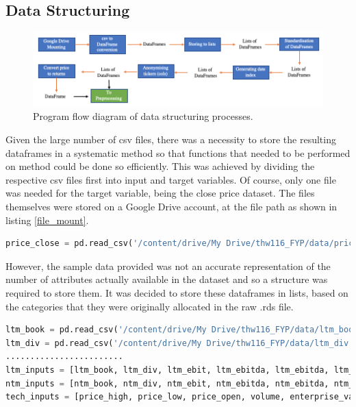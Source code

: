 \documentclass[10pt,onecolumn,letterpaper]{article}
\begin{document}
\fi

\subsection{Data Structuring}
 
\begin{figure}[!hbt!]
\centering
\includegraphics[width=\columnwidth]{data_structuring.png}
\caption{Program flow diagram of data structuring processes.}
\label{data_structuring}
\end{figure}
 
Given the large number of csv files, there was a necessity to store the resulting dataframes in a systematic method so that functions that needed to be performed on method could be done so efficiently. This was achieved by dividing the respective csv files first into input and target variables. Of course, only one file was needed for the target variable, being the close price dataset. The files themselves were stored on a Google Drive account, at the file path as shown in listing \ref{file_mount}. 

\begin{lstlisting}[language=Python, breaklines=true, label = {file_mount}, caption={Importing csv file to dataframe.}]
price_close = pd.read_csv('/content/drive/My Drive/thw116_FYP/data/price_close.csv')
\end{lstlisting}

However, the sample data provided was not an accurate representation of the number of attributes actually available in the dataset and so a structure was required to store them. It was decided to store these dataframes in lists, based on the categories that they were originally allocated in the raw .rds file. 

\begin{lstlisting}[language=Python, breaklines=true, caption=Formation of lists of dataframes according to type of input.]
ltm_book = pd.read_csv('/content/drive/My Drive/thw116_FYP/data/ltm_book.csv')
ltm_div = pd.read_csv('/content/drive/My Drive/thw116_FYP/data/ltm_div.csv')
........................
ltm_inputs = [ltm_book, ltm_div, ltm_ebit, ltm_ebitda, ltm_ebitda, ltm_eps, ltm_fcf, ltm_pbook, ltm_sales] 
ntm_inputs = [ntm_book, ntm_div, ntm_ebit, ntm_ebitda, ntm_ebitda, ntm_eps, ntm_fcf, ntm_pbook, ntm_sales]
tech_inputs = [price_high, price_low, price_open, volume, enterprise_val]
\end{lstlisting} 
\end{document}
